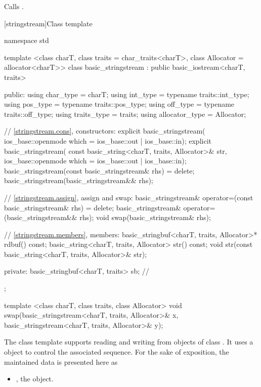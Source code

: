 \begin{itemdescr}
\pnum
\effects
Calls
.
\end{itemdescr}

[stringstream]{Class template }

%
\begin{codeblock}
namespace std {
  template <class charT, class traits = char_traits<charT>,
            class Allocator = allocator<charT>>
  class basic_stringstream
    : public basic_iostream<charT, traits> {
  public:
    using char_type      = charT;
    using int_type       = typename traits::int_type;
    using pos_type       = typename traits::pos_type;
    using off_type       = typename traits::off_type;
    using traits_type    = traits;
    using allocator_type = Allocator;

    // \ref{stringstream.cons}, constructors:
    explicit basic_stringstream(
      ios_base::openmode which = ios_base::out | ios_base::in);
    explicit basic_stringstream(
      const basic_string<charT, traits, Allocator>& str,
      ios_base::openmode which = ios_base::out | ios_base::in);
    basic_stringstream(const basic_stringstream& rhs) = delete;
    basic_stringstream(basic_stringstream&& rhs);

    // \ref{stringstream.assign}, assign and swap:
    basic_stringstream& operator=(const basic_stringstream& rhs) = delete;
    basic_stringstream& operator=(basic_stringstream&& rhs);
    void swap(basic_stringstream& rhs);

    // \ref{stringstream.members}, members:
    basic_stringbuf<charT, traits, Allocator>* rdbuf() const;
    basic_string<charT, traits, Allocator> str() const;
    void str(const basic_string<charT, traits, Allocator>& str);

  private:
    basic_stringbuf<charT, traits> sb;  // \expos
  };

  template <class charT, class traits, class Allocator>
    void swap(basic_stringstream<charT, traits, Allocator>& x,
              basic_stringstream<charT, traits, Allocator>& y);
}
\end{codeblock}

\pnum
The
class template
supports reading and writing from objects of class
.
It uses a
object to control the associated sequence.
For the sake of exposition, the maintained data is presented here as
\begin{itemize}
\item
{}, the  object.
\end{itemize}

